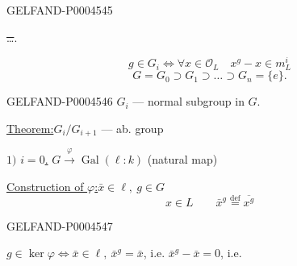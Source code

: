 \begin{GelfandAdjacentEvidence}{GELFAND-P000454}{5}


\quad \sout{\ldots}.

\[
g\in G_i\Longleftrightarrow \forall x\in \mathcal O_L\quad x^g-x\in m_L^i
\]
\[
G=G_0\supset G_1\supset\ldots\supset G_n=\{e\}.
\]
\end{GelfandAdjacentEvidence}
\begin{GelfandAdjacentEvidence}{GELFAND-P000454}{6}
$G_i$ — normal subgroup in $G$.

\underline{Theorem:}\quad $G_i/G_{i+1}$ — ab. group

$1)$ \underline{$i=0$.}\qquad
$G\overset{\varphi}{\longrightarrow}\operatorname{Gal}(\ell:k)$
(natural map)

\underline{Construction of $\varphi$:}\quad $\bar x\in\ell,\ g\in G$
\[
x\in L\qquad \bar x^g\overset{\mathrm{def}}{=}\overline{x^g}
\]
\end{GelfandAdjacentEvidence}
\begin{GelfandAdjacentEvidence}{GELFAND-P000454}{7}


$g\in\ker\varphi\Longleftrightarrow \bar x\in\ell,\ \bar x^g=\bar x$,
i.e. $\bar x^g-\bar x=0$, i.e.
\end{GelfandAdjacentEvidence}



